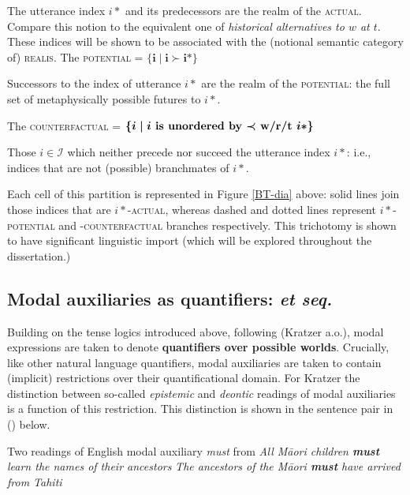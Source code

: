 \documentclass[12pt,dvipsnames]{report}
\begin{document}
The utterance index $ i* $ and its predecessors are the realm of the \textsc{actual}.
Compare this notion to the equivalent one of \textit{historical alternatives to $ w $ at $ t $}. These indices will be shown to be associated with the (notional semantic category of) \textsc{realis}.
\a The \textsc{potential} = $ \boldsymbol{\{i\mid i\succ i*\} }$

Successors to the index of utterance $ i* $ are the realm of the \textsc{potential}: the full set of metaphysically possible futures to $ i* $.

\a The \textsc{counterfactual} = $\boldsymbol{ \{i\mid i \textbf{ is unordered by $ \boldsymbol\prec $ w/r/t } i* \}}$

Those $ i\in\mathcal I $ which neither precede nor succeed the utterance index $ i* $: i.e., indices that are not (possible) branchmates of $ i* $.

\xe

 Each cell of this partition is represented in Figure \ref{BT-dia} above: solid lines join those indices that are \textsc{$ i* $-actual}, whereas dashed and dotted lines represent \textsc{$ i* $-potential} and \textsc{-counterfactual} branches respectively. This trichotomy is shown to have significant linguistic import (which will be explored throughout the dissertation.)

\subsection{Modal auxiliaries as quantifiers: \citealt{Kratzer1977} \textit{et seq.}}
 Building on the tense logics introduced above, following (Kratzer \citeyear{Kratzer1977,Kratzer1981,Kratzer1991} a.o.), modal expressions are taken to denote \textbf{quantifiers over possible worlds}. Crucially, like other natural language quantifiers, modal auxiliaries are taken to contain (implicit) restrictions over their quantificational domain. For Kratzer the distinction between so-called \textit{epistemic} and \textit{deontic} readings of modal auxiliaries is a function of this restriction. This distinction is shown in the sentence pair in () below.

\pex Two readings of English modal auxiliary \textit{must} from \citet[338]{Kratzer1977}
\a\textit{All Māori children \textbf{must} learn the names of their ancestors}
\a\textit{The ancestors of the Māori \textbf{must} have arrived from Tahiti}
\xe
\end{document}
